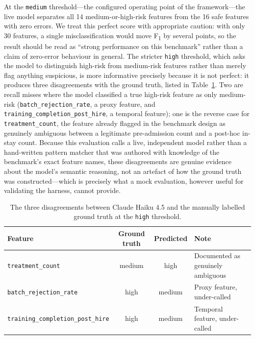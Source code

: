 \documentclass[12pt,a4paper]{report}
\newcommand{\tblhead}{\rowcolor{tblHeadBg}\color{white}\bfseries}
\begin{document}
At the \texttt{medium} threshold---the configured operating point of the framework---the
live model separates all 14 medium-or-high-risk features from the 16 safe features with
zero errors.  We treat this perfect score with appropriate caution: with only 30 features,
a single misclassification would move F\textsubscript{1} by several points, so the result
should be read as ``strong performance on this benchmark'' rather than a claim of
zero-error behaviour in general.  The stricter \texttt{high} threshold, which asks the
model to distinguish high-risk from medium-risk features rather than merely flag anything
suspicious, is more informative precisely because it is not perfect: it produces three
disagreements with the ground truth, listed in Table~\ref{tab:semantic_errors}.  Two are
recall misses where the model classified a true high-risk feature as only medium-risk
(\texttt{batch\_rejection\_rate}, a proxy feature, and
\texttt{training\_completion\_post\_hire}, a temporal feature); one is the reverse case for
\texttt{treatment\_count}, the feature already flagged in the benchmark design as
genuinely ambiguous between a legitimate pre-admission count and a post-hoc in-stay count.
Because this evaluation calls a live, independent model rather than a hand-written pattern
matcher that was authored with knowledge of the benchmark's exact feature names, these
disagreements are genuine evidence about the model's semantic reasoning, not an artefact of
how the ground truth was constructed---which is precisely what a mock evaluation, however
useful for validating the harness, cannot provide.

\begin{table}[!ht]
\centering
\caption{The three disagreements between Claude Haiku 4.5 and the manually labelled ground
  truth at the \texttt{high} threshold.}
\label{tab:semantic_errors}
\scriptsize
{}
\begin{tabular}{lccl}
\toprule
\tblhead \textbf{Feature} & \textbf{Ground truth} & \textbf{Predicted} & \textbf{Note} \\
\midrule
\texttt{treatment\_count} & medium & high & Documented as genuinely ambiguous \\
\texttt{batch\_rejection\_rate} & high & medium & Proxy feature, under-called \\
\texttt{training\_completion\_post\_hire} & high & medium & Temporal feature, under-called \\
\bottomrule
\end{tabular}
\end{table}
\end{document}
